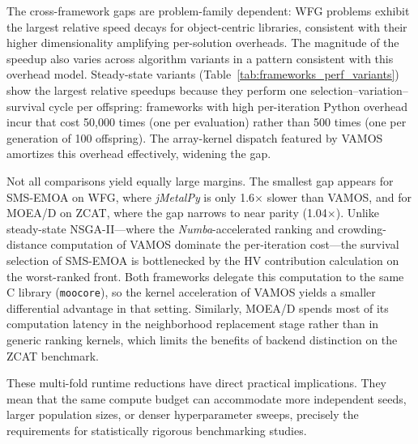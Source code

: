 \documentclass[journal]{IEEEtran}
\newcommand{\VAMOS}{VAMOS}
\begin{document}
The cross-framework gaps are problem-family dependent: WFG problems exhibit the largest relative speed decays for object-centric libraries, consistent with their higher dimensionality amplifying per-solution overheads. The magnitude of the speedup also varies across algorithm variants in a pattern consistent with this overhead model. Steady-state variants (Table~\ref{tab:frameworks_perf_variants}) show the largest relative speedups because they perform one selection--variation--survival cycle per offspring: frameworks with high per-iteration Python overhead incur that cost 50{,}000 times (one per evaluation) rather than 500 times (one per generation of 100 offspring). The array-kernel dispatch featured by VAMOS amortizes this overhead effectively, widening the gap.

Not all comparisons yield equally large margins. The smallest gap appears for SMS-EMOA on WFG, where \textit{jMetalPy} is only 1.6$\times$ slower than \VAMOS{}, and for MOEA/D on ZCAT, where the gap narrows to near parity (1.04$\times$). Unlike steady-state NSGA-II---where the \textit{Numba}-accelerated ranking and crowding-distance computation of \VAMOS{} dominate the per-iteration cost---the survival selection of SMS-EMOA is bottlenecked by the HV contribution calculation on the worst-ranked front. Both frameworks delegate this computation to the same C library (\texttt{moocore}), so the kernel acceleration of \VAMOS{} yields a smaller differential advantage in that setting. Similarly, MOEA/D spends most of its computation latency in the neighborhood replacement stage rather than in generic ranking kernels, which limits the benefits of backend distinction on the ZCAT benchmark.

These multi-fold runtime reductions have direct practical implications. They mean that the same compute budget can accommodate more independent seeds, larger population sizes, or denser hyperparameter sweeps, precisely the requirements for statistically rigorous benchmarking studies.


\end{document}
